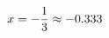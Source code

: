 \documentclass[preview]{standalone}
\begin{document}
\begin{align*}
\special{dvisvgm:raw <g id='unique000'>}x = - \frac{1}{3} \approx -0.333\special{dvisvgm:raw </g>}
\end{align*}
\end{document}
